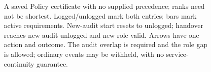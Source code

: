 \begin{figure}[!htbp]
\begin{tikzpicture}
\end{tikzpicture}
\caption{A saved Policy certificate with no supplied precedence; ranks need not be shortest. Logged/unlogged mark both entries; bars mark active requirements. New-audit start resets to unlogged; handover reaches new audit unlogged and new role valid. Arrows have one action and outcome. The audit overlap is required and the role gap is allowed; ordinary events may be withheld, with no service-continuity guarantee.}
\label{fig:policy-lifetimes}
\end{figure}
